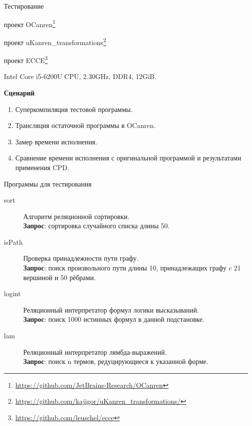 \documentclass[xcolor=table]{beamer}
\begin{document}
%
\begin{frame}{Тестирование}

\begin{description}[leftmargin=!]
\item[Реализация miniKanren:] проект OCanren\footnote{\url{https://github.com/JetBrains-Research/OCanren}}\\
\item[Реализация CPD для miniKanren:] проект uKanren\_transformations\footnote{\url{https://github.com/kajigor/uKanren_transformations/}}
\item[Реализация CPD для Prolog:] проект ECCE\footnote{\url{https://github.com/leuschel/ecce}}
\item[Платформа:] Intel Core i5-6200U CPU, 2.30GHz, DDR4, 12GiB.
\end{description}
{\bf Сценарий}
\begin{enumerate}
\item Суперкомпиляция тестовой программы.
\item Трансляция остаточной программы в OCanren.
\item Замер времени исполнения.
\item Сравнение времени исполнения с оригинальной программой и результатами
      применения CPD.
\end{enumerate}
\end{frame}
%
\begin{frame}{Программы для тестирования}
\begin{description}
\item[sort]Алгоритм реляционной сортировки.\\
      {\bf Запрос}: сортировка случайного списка длины 50.
\item[isPath] Проверка принадлежности пути графу.\\
      {\bf Запрос}: поиск  произвольного пути длины 10, принадлежащих графу c 21 вершиной и 50 рёбрами.
\item[logint] Реляционный интерпретатор формул логики высказываний.\\
      {\bf Запрос}: поиск 1000 истинных формул в данной подстановке.
\item[lam] Реляционный интерпретатор лямбда-выражений.\\
      {\bf Запрос}: поиск n термов, редуцирующиеся к указанной форме.
\end{description}
\end{frame}
\end{document}
